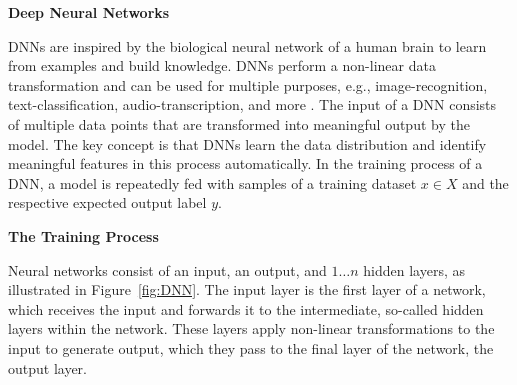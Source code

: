 \textbf{Deep Neural Networks}

DNNs are inspired by the biological neural network of a human brain to learn from examples and build knowledge. 
DNNs perform a non-linear data transformation and can be used for multiple purposes, e.g., image-recognition, text-classification, audio-transcription, and more \cite{rawat2017deep}.
The input of a DNN consists of multiple data points that are transformed into meaningful output by the model. The key concept is that DNNs learn the data distribution and identify meaningful features in this process automatically.
In the training process of a DNN, a model is repeatedly fed with samples of a training dataset $x \in X$ and the respective expected output label $y$.

\textbf{The Training Process}

Neural networks consist of an input, an output, and $1\dots n$ hidden layers, as illustrated in Figure~\ref{fig:DNN}.
The input layer is the first layer of a network, which receives the input and forwards it to the intermediate, so-called hidden layers within the network. These layers apply non-linear transformations to the input to generate output, which they pass to the final layer of the network, the output layer. 

